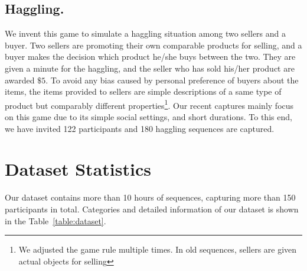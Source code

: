 \subsection{Haggling.} We invent this game to simulate a haggling situation among two sellers and a buyer. Two sellers are promoting their own comparable products for selling, and a buyer makes the decision which product he/she buys between the two. They are given a minute for the haggling, and the seller who has sold his/her product are awarded $\$5$. To avoid any bias caused by personal preference of buyers about the items, the items provided to sellers are simple descriptions of a same type of product but comparably different properties\footnote{We adjusted the game rule multiple times. In old sequences, sellers are given actual objects for selling}. Our recent captures mainly focus on this game due to its simple social settings, and short durations. To this end, we have invited 122 participants and 180 haggling sequences are captured. 
%

\section{Dataset Statistics}
Our dataset contains more than 10 hours of sequences, capturing more than 150 participants in total. Categories and detailed information of our dataset is shown in the Table~\ref{table:dataset}.

